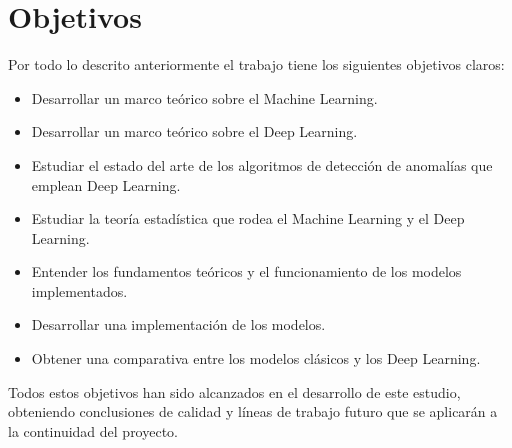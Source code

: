 \section{Objetivos}

Por todo lo descrito anteriormente el trabajo tiene los siguientes objetivos claros:

\begin{itemize}
	\item Desarrollar un marco teórico sobre el Machine Learning.
	\item Desarrollar un marco teórico sobre el Deep Learning.
	\item Estudiar el estado del arte de los algoritmos de detección de anomalías que emplean Deep Learning.
	\item Estudiar la teoría estadística que rodea el Machine Learning y el Deep Learning.
	\item Entender los fundamentos teóricos y el funcionamiento de los modelos implementados.
	\item Desarrollar una implementación de los modelos.
	\item Obtener una comparativa entre los modelos clásicos y los Deep Learning.
\end{itemize}

Todos estos objetivos han sido alcanzados en el desarrollo de este estudio, obteniendo conclusiones de calidad y líneas de trabajo futuro que se aplicarán a la continuidad del proyecto.